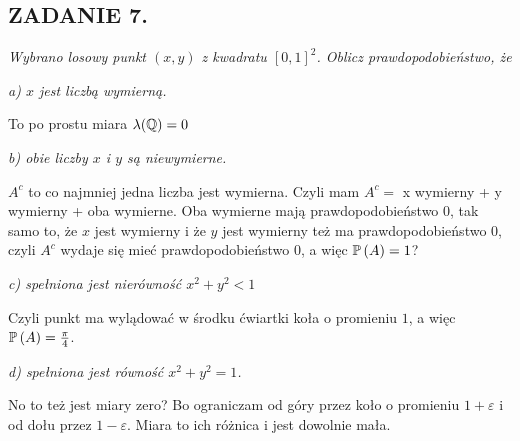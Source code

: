 \documentclass{article}
\begin{document}
\subsection*{ZADANIE 7.}
\emph{Wybrano losowy punkt $(x,y)$ z kwadratu $[0,1]^2$. Oblicz prawdopodobieństwo, że}

\indent \emph{\color{blue}a) $x$ jest liczbą wymierną.}
\smallskip

To po prostu miara $\lambda(\mathbb{Q})=0$
\smallskip

\indent \emph{\color{blue}b) obie liczby $x$ i $y$ są niewymierne.}
\smallskip

$A^c$ to co najmniej jedna liczba jest wymierna. Czyli mam $A^c=$ x wymierny + y wymierny + oba wymierne. Oba wymierne mają prawdopodobieństwo 0, tak samo to, że $x$ jest wymierny i że $y$ jest wymierny też ma prawdopodobieństwo $0$, czyli $A^c$ wydaje się mieć prawdopodobieństwo $0$, a więc $\mathbb{P}\left(A\right)=1$?
\smallskip

\indent \emph{\color{blue}c) spełniona jest nierówność $x^2+y^2<1$}
\smallskip

Czyli punkt ma wylądować w środku ćwiartki koła o promieniu $1$, a więc $\mathbb{P}\left(A\right)=\frac\pi4$.
\smallskip

\indent \emph{\color{blue}d) spełniona jest równość $x^2+y^2=1$.}
\smallskip

No to też jest miary zero? Bo ograniczam od góry przez koło o promieniu $1+\varepsilon$ i od dołu przez $1-\varepsilon$. Miara to ich różnica i jest dowolnie mała.
\end{document}
